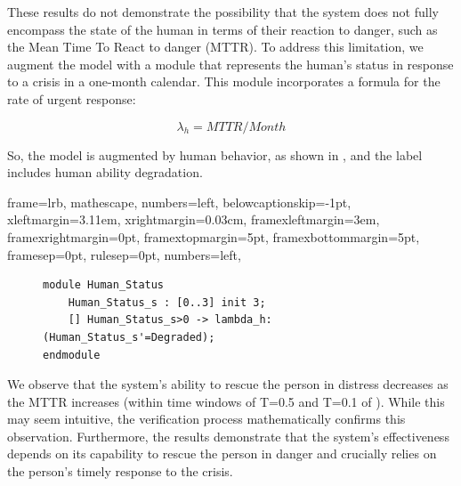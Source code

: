 These results do not demonstrate the possibility that the system does not fully encompass the state of the human in terms of their reaction to danger, such as the Mean  Time To React to danger (MTTR). To address this limitation, we augment the model with a module that represents the human's status in response to a crisis in a one-month calendar. This module incorporates a formula for the rate of urgent response: 

\begin{equation*}
\lambda_{h} = MTTR / Month 
\end{equation*}

So, the model is augmented by human behavior, as shown in , and the label  includes human ability degradation.

{
	frame=lrb,
	mathescape,
	numbers=left,
	belowcaptionskip=-1pt,
	xleftmargin=3.11em,
	xrightmargin=0.03cm,
	framexleftmargin=3em,
	framexrightmargin=0pt,
	framextopmargin=5pt,
	framexbottommargin=5pt,
	framesep=0pt,
	rulesep=0pt,
	numbers=left,
}


\begin{figure}[!htb]
\begin{minipage}{9cm}
\begin{lstlisting}[style=framed,
	caption=The Human Status,
 	label=exampleinprism]
module Human_Status
    Human_Status_s : [0..3] init 3;
    [] Human_Status_s>0 -> lambda_h:(Human_Status_s'=Degraded); 
endmodule
\end{lstlisting}
\end{minipage}
\end{figure}

We observe that the system's ability to rescue the person in distress decreases as the MTTR increases (within time windows of T=0.5 and T=0.1 of ). While this may seem intuitive, the verification process mathematically confirms this observation. Furthermore, the results demonstrate that the system's effectiveness depends on its capability to rescue the person in danger and crucially relies on the person's timely response to the crisis.

